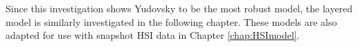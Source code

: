 Since this investigation shows Yudovsky to be the most robust model, the layered model is similarly investigated in the following chapter. These models are also adapted for use with snapshot HSI data in Chapter \ref{chap:HSImodel}. 





% 

% 

% 

